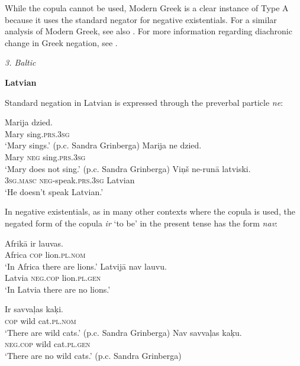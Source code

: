 ﻿\documentclass[output=paper]{langsci/langscibook}
\begin{document}
\begin{unindented}
While the copula cannot be used, Modern Greek is a clear instance of Type A
because it uses the standard negator for negative existentials. For a
similar analysis of Modern Greek, see also
\citet[115--116]{Veselinova2013}.  For more information regarding
diachronic change in Greek negation, see \citet{KiparskyCondoravdi2006-ieur}. 

\textit{3. Baltic}

\textbf{Latvian}

Standard negation in Latvian is expressed through the preverbal particle \textit{ne}: 
%
\begin{exe}\ex \gll Marija dzied. \\
Mary sing.\textsc{prs.3sg} \\
    \glt `Mary sings.' (p.c. Sandra Grinberga)
\ex \gll Marija   ne   dzied. \\
Mary \textsc{neg} sing.\textsc{prs.3sg} \\
    \glt `Mary does not sing.' (p.c. Sandra Grinberga)
\ex \gll Viņš ne-runā latviski. \\
\textsc{3sg}.\textsc{masc} \textsc{neg}-speak.\textsc{prs.3sg} Latvian \\
    \glt `He doesn't speak Latvian.' \citep[164]{Mathiassen1997}
    \end{exe}

In negative existentials, as in many other contexts where the copula is used, the negated form of the copula \textit{ir} `to be' in the present tense has the form \textit{nav}: 
%
\begin{exe}\ex \gll Afrikā ir lauvas. \\
Africa \textsc{cop} lion.\textsc{pl.nom} \\
    \glt `In Africa there are lions.' \citep[164]{Mathiassen1997}
\ex \gll Latvijā nav lauvu. \\
Latvia \textsc{neg.cop} lion.\textsc{pl.gen} \\
    \glt `In Latvia there are no lions.' \citep[164]{Mathiassen1997}
\ex\begin{xlist}
\ex \gll Ir savvaļas kaķi. \\
\textsc{cop} wild cat.\textsc{pl.nom} \\
    \glt `There are wild cats.' (p.c. Sandra Grinberga)
\ex\gll Nav savvaļas kaķu.\\
\textsc{neg}.\textsc{cop} wild cat.\textsc{pl.gen}\\
\glt `There are no wild cats.' (p.c. Sandra Grinberga)
    \end{xlist}\end{exe}


\end{unindented}
\end{document}
